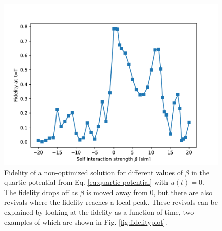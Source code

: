 \documentclass[a4paper, twocolumn]{revtex4-1}
\begin{document}
\begin{figure}[h]
	\includegraphics[width=\columnwidth]{graphics/exploration/nonOptBeta.pdf}
	\caption{Fidelity of a non-optimized solution for different values of $\beta$ in the quartic potential from Eq. \eqref{eq:quartic-potential} with $u(t) = 0$. The fidelity drops off as $\beta$ is moved away from $0$, but there are also revivals where the fidelity reaches a local peak. These revivals can be explained by looking at the fidelity as a function of time, two examples of which are shown in Fig. \ref{fig:fidelityplot}.}
	\label{fig:beta}
\end{figure}
\end{document}
